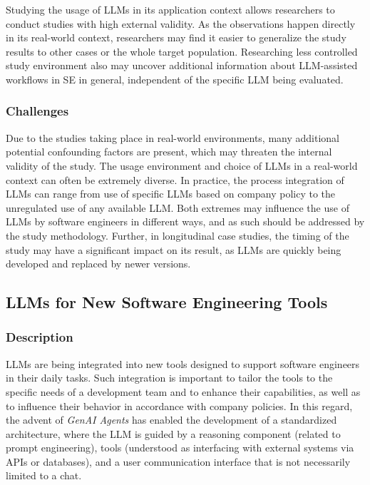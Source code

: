 \documentclass[11pt]{article}
\begin{document}
Studying the usage of LLMs in its application context allows researchers to conduct studies with high external validity.
As the observations happen directly in its real-world context, researchers may find it easier to generalize the study results to other cases or the whole target population.
Researching less controlled study environment also may uncover additional information about LLM-assisted workflows in SE in general, independent of the specific LLM being evaluated.

\subsubsection{Challenges}

Due to the studies taking place in real-world environments, many additional potential confounding factors are present, which may threaten the internal validity of the study.
The usage environment and choice of LLMs in a real-world context can often be extremely diverse.
In practice, the process integration of LLMs can range from use of specific LLMs based on company policy to the unregulated use of any available LLM. 
Both extremes may influence the use of LLMs by software engineers in different ways, and as such should be addressed by the study methodology.
Further, in longitudinal case studies, the timing of the study may have a significant impact on its result, as LLMs are quickly being developed and replaced by newer versions.

\subsection{LLMs for New Software Engineering Tools}

\subsubsection{Description}

LLMs are being integrated into new tools designed to support software engineers in their daily tasks.
Such integration is important to tailor the tools to the specific needs of a development team and to enhance their capabilities, as well as to influence their behavior in accordance with company policies.
In this regard, the advent of \textit{GenAI Agents} has enabled the development of a standardized architecture, where the LLM is guided by a reasoning component (related to prompt engineering), tools (understood as interfacing with external systems via APIs or databases), and a user communication interface that is not necessarily limited to a chat.
\end{document}
